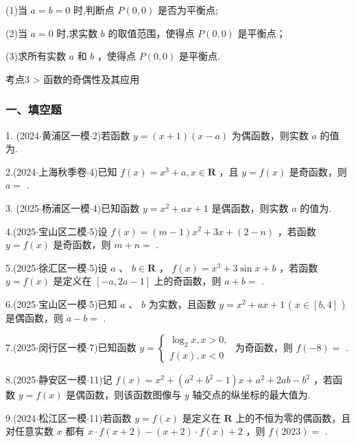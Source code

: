 (1)当 $a = b = 0$ 时,判断点 $P\left( {0,0}\right)$ 是否为平衡点;

(2)当 $a = 0$ 时,求实数 $b$ 的取值范围，使得点 $P\left( {0,0}\right)$ 是平衡点；

(3)求所有实数 $a$ 和 $b$ ，使得点 $P\left( {0,0}\right)$ 是平衡点.

考点3 > 函数的奇偶性及其应用

\subsubsection*{一、填空题}

1. (2024$\cdot$黄浦区一模$\cdot$2)若函数 $y = \left( {x + 1}\right) \left( {x - a}\right)$ 为偶函数，则实数 $a$ 的值为\blkda[2]{}.

2.(2024$\cdot$上海秋季卷$\cdot$4)已知 $f\left( x\right)  = {x}^{3} + a,x \in  \mathbf{R}$ ，且 $y = f\left( x\right)$ 是奇函数，则 $a =$ \blkda[2]{}.

3. (2025$\cdot$杨浦区一模$\cdot$4)已知函数 $y = {x}^{2} + {ax} + 1$ 是偶函数，则实数 $a$ 的值为\blkda[2]{}.

4.(2025$\cdot$宝山区二模$\cdot$5)设 $f\left( x\right)  = \left( {m - 1}\right) {x}^{2} + {3x} + \left( {2 - n}\right)$ ，若函数 $y = f\left( x\right)$ 是奇函数，则 $m + n =$ \blkda[2]{}.

5.(2025$\cdot$徐汇区一模$\cdot$5)设 $a$ 、 $b \in  \mathbf{R}$ ， $f\left( x\right)  = {x}^{3} + 3\sin x + b$ ，若函数 $y = f\left( x\right)$ 是定义在 $\left\lbrack  {-a,{2a} - 1}\right\rbrack$ 上的奇函数，则 $a + b =$ \blkda[2]{}.

6.(2025$\cdot$宝山区一模$\cdot$5)已知 $a$ 、 $b$ 为实数，且函数 $y = {x}^{2} + {ax} + 1$ ( $x \in  \left\lbrack  {b,4}\right\rbrack$ ) 是偶函数，则 $a - b =$ \blkda[2]{}.

7.(2025$\cdot$闵行区一模$\cdot$7)已知函数 $y = \left\{  \begin{array}{l} {\log }_{2}x,x > 0, \\  f\left( x\right) ,x < 0 \end{array}\right.$ 为奇函数，则 $f\left( {-8}\right)  =$ \blkda[2]{}.

8.(2025$\cdot$静安区一模$\cdot$11)记 $f\left( x\right)  = {x}^{2} + \left( {{a}^{2} + {b}^{2} - 1}\right) x + {a}^{2} + {2ab} - {b}^{2}$ ，若函数 $y = f\left( x\right)$ 是偶函数，则该函数图像与 $y$ 轴交点的纵坐标的最大值为\blkda[2]{}.

9.(2024$\cdot$松江区一模$\cdot$11)若函数 $y = f\left( x\right)$ 是定义在 $\mathbf{R}$ 上的不恒为零的偶函数，且对任意实数 $x$ 都有 $x \cdot  f\left( {x + 2}\right)  - \left( {x + 2}\right)  \cdot  f\left( x\right)  + 2$ ，则 $f\left( {2023}\right)  =$ \blkda[2]{}.

